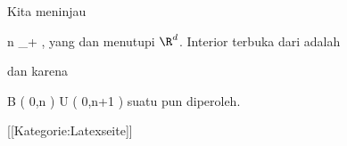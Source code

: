 Kita meninjau

 {}
 {n \in \N_+} {}
 {} {} {} {,}
yang
dan menutupi $\R^d$. Interior terbuka dari
adalah

 dan karena

\mavergleichskettedisp
{\vergleichskette
{ B  \left(  0,n \right)
}
{ \subseteq} { U \left(   0,n+1  \right)
}
{ } {
}
{ } {
}
{ } {
}
}
{}{}{}
suatu
pun diperoleh.

 [[Kategorie:Latexseite]]
